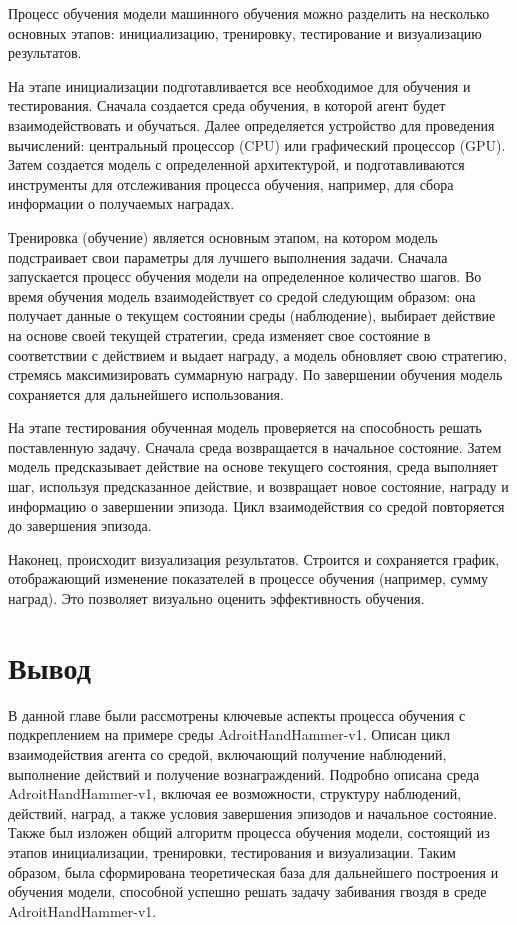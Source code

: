 Процесс обучения модели машинного обучения можно разделить на несколько основных этапов: 
инициализацию, тренировку, тестирование и визуализацию результатов. 

На этапе инициализации подготавливается все необходимое для обучения и тестирования. 
Сначала создается среда обучения, в которой агент будет взаимодействовать и обучаться. 
Далее определяется устройство для проведения вычислений: центральный процессор (CPU) или графический процессор (GPU). 
Затем создается модель с определенной архитектурой, и подготавливаются инструменты для отслеживания процесса обучения, например, для сбора информации о получаемых наградах.

Тренировка (обучение) является основным этапом, на котором модель подстраивает свои параметры для лучшего выполнения задачи. 
Сначала запускается процесс обучения модели на определенное количество шагов. 
Во время обучения модель взаимодействует со средой следующим образом: она получает данные о текущем состоянии среды (наблюдение), 
выбирает действие на основе своей текущей стратегии, среда изменяет свое состояние в соответствии с действием и выдает награду, 
а модель обновляет свою стратегию, стремясь максимизировать суммарную награду. 
По завершении обучения модель сохраняется для дальнейшего использования.

На этапе тестирования обученная модель проверяется на способность решать поставленную задачу. 
Сначала среда возвращается в начальное состояние. 
Затем модель предсказывает действие на основе текущего состояния, среда выполняет шаг, 
используя предсказанное действие, и возвращает новое состояние, награду и информацию о завершении эпизода. 
Цикл взаимодействия со средой повторяется до завершения эпизода.

Наконец, происходит визуализация результатов. 
Строится и сохраняется график, отображающий изменение показателей в процессе обучения (например, сумму наград). 
Это позволяет визуально оценить эффективность обучения.

\section*{Вывод}

В данной главе были рассмотрены ключевые аспекты процесса обучения с подкреплением на примере среды AdroitHandHammer-v1. 
Описан цикл взаимодействия агента со средой, включающий получение наблюдений, выполнение действий и получение вознаграждений. 
Подробно описана среда AdroitHandHammer-v1, включая ее возможности, структуру наблюдений, действий, наград, а также условия завершения эпизодов и начальное состояние. 
Также был изложен общий алгоритм процесса обучения модели, состоящий из этапов инициализации, тренировки, тестирования и визуализации. 
Таким образом, была сформирована теоретическая база для дальнейшего построения и обучения модели, способной успешно решать задачу забивания гвоздя в среде AdroitHandHammer-v1.

\clearpage
